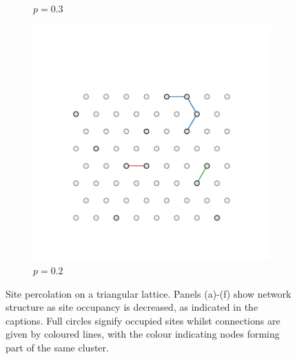 \begin{figure}[bt]
\begin{subfigure}[b]{0.3\textwidth}
         \caption{$p=0.3$}
         \label{fig:perctri3}
     \end{subfigure}
     \hfill
         \begin{subfigure}[b]{0.3\textwidth}
         \centering
         \includegraphics[width=\textwidth]{./figures/targeted_opt/perc_tri_2.pdf}
         \caption{$p=0.2$}
         \label{fig:perctri2}
     \end{subfigure}
     \hfill
     
     \caption{Site percolation on a triangular lattice. Panels (a)\--(f) show network structure as site occupancy is decreased, as indicated in the captions. Full circles signify occupied sites whilst connections are given by coloured lines, with the colour indicating nodes forming part of the same cluster.}
     \label{fig:perctri}
\end{figure}

